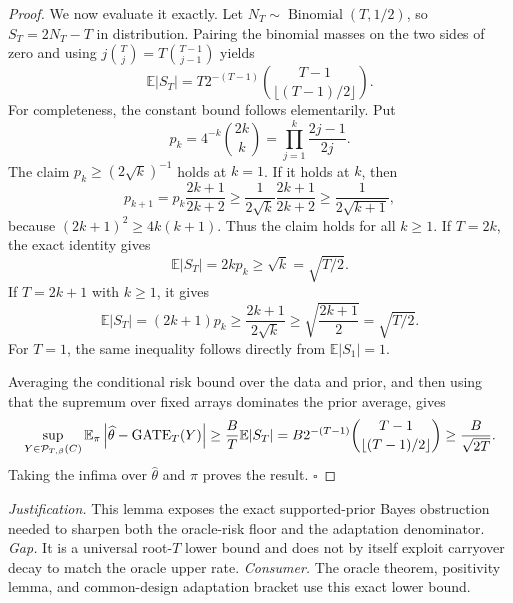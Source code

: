 \documentclass{article}
\begin{document}
\begin{proof}
We now evaluate it exactly. Let \(N_T\sim\operatorname{Binomial}(T,1/2)\), so \(S_T=2N_T-T\) in distribution. Pairing the binomial masses on the two sides of zero and using \(j\binom{T}{j}=T\binom{T-1}{j-1}\) yields
\[
\mathbb E|S_T|
=T2^{-(T-1)}\binom{T-1}{\lfloor(T-1)/2\rfloor}.
\]
For completeness, the constant bound follows elementarily. Put
\[
p_k=4^{-k}\binom{2k}{k}=\prod_{j=1}^k\frac{2j-1}{2j}.
\]
The claim \(p_k\ge(2\sqrt{k})^{-1}\) holds at \(k=1\). If it holds at \(k\), then
\[
p_{k+1}=p_k\frac{2k+1}{2k+2}\ge\frac{1}{2\sqrt{k}}\frac{2k+1}{2k+2}\ge\frac{1}{2\sqrt{k+1}},
\]
because \((2k+1)^2\ge4k(k+1)\). Thus the claim holds for all \(k\ge1\). If \(T=2k\), the exact identity gives
\[
\mathbb E|S_T|=2k p_k\ge\sqrt{k}=\sqrt{T/2}.
\]
If \(T=2k+1\) with \(k\ge1\), it gives
\[
\mathbb E|S_T|=(2k+1)p_k\ge\frac{2k+1}{2\sqrt{k}}\ge\sqrt{\frac{2k+1}{2}}=\sqrt{T/2}.
\]
For \(T=1\), the same inequality follows directly from \(\mathbb E|S_1|=1\).

Averaging the conditional risk bound over the data and prior, and then using that the supremum over fixed arrays dominates the prior average, gives
\[
\makebox[\linewidth][c]{\resizebox{0.98\linewidth}{!}{\(\displaystyle \sup_{Y\in\mathcal P_{T,\beta}(C)}
\mathbb E_\pi\left|\widehat\theta-\operatorname{GATE}_T(Y)\right|
\ge \frac BT\mathbb E|S_T|
=B2^{-(T-1)}\binom{T-1}{\lfloor(T-1)/2\rfloor}
\ge\frac{B}{\sqrt{2T}}.\)}}
\]
Taking the infima over \(\widehat\theta\) and \(\pi\) proves the result. \(\square\)
\end{proof}
\par\smallskip\noindent \textit{Justification.} This lemma exposes the exact supported-prior Bayes obstruction needed to sharpen both the oracle-risk floor and the adaptation denominator. \textit{Gap.} It is a universal root-\(T\) lower bound and does not by itself exploit carryover decay to match the oracle upper rate. \textit{Consumer.} The oracle theorem, positivity lemma, and common-design adaptation bracket use this exact lower bound.
\end{document}
